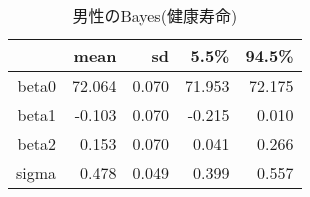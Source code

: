 \begin{table}[ht]
\centering
\begingroup\tiny
\begin{tabular}{rrrrr}
  \hline
 & mean & sd & 5.5\% & 94.5\% \\ 
  \hline
beta0 & 72.064 & 0.070 & 71.953 & 72.175 \\ 
  beta1 & -0.103 & 0.070 & -0.215 & 0.010 \\ 
  beta2 & 0.153 & 0.070 & 0.041 & 0.266 \\ 
  sigma & 0.478 & 0.049 & 0.399 & 0.557 \\ 
   \hline
\end{tabular}
\endgroup
\caption{男性のBayes(健康寿命)} 
\label{table_Gamma_HLE_FA_m}
\end{table}
